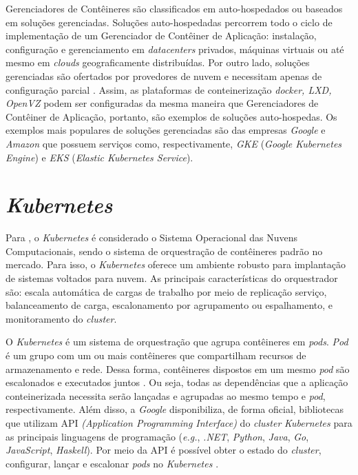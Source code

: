 Gerenciadores de Contêineres são classificados em auto-hospedados ou baseados em soluções gerenciadas. Soluções auto-hospedadas percorrem todo o ciclo de implementação de um Gerenciador de Contêiner de Aplicação: instalação, configuração e gerenciamento em \textit{datacenters} privados, máquinas virtuais ou até mesmo em \textit{clouds} geograficamente distribuídas. Por outro lado, soluções gerenciadas são ofertados por provedores de nuvem e necessitam apenas de configuração parcial \cite{casalicchio2020state}. Assim, as plataformas de conteinerização \textit{docker, LXD, OpenVZ} podem ser configuradas da mesma maneira que Gerenciadores de Contêiner de Aplicação, portanto, são exemplos de soluções auto-hospedas. Os exemplos mais populares de soluções gerenciadas são das empresas \textit{Google} e \textit{Amazon} que possuem serviços como, respectivamente, \textit{GKE} (\textit{Google Kubernetes Engine}) e \textit{EKS} (\textit{Elastic Kubernetes Service}).

\section{\textit{Kubernetes}}
Para , o \textit{Kubernetes} é considerado o Sistema Operacional das Nuvens Computacionais, sendo o sistema de orquestração de contêineres padrão no mercado. Para isso, o \textit{Kubernetes} oferece um ambiente robusto para implantação de sistemas voltados para nuvem. As principais características do orquestrador são: escala automática de cargas de trabalho por meio de replicação serviço, balanceamento de carga, escalonamento por agrupamento ou espalhamento, e monitoramento do \textit{cluster}.

O \textit{Kubernetes} é um sistema de orquestração que agrupa contêineres em \textit{pods}. \textit{Pod} é um grupo com um ou mais contêineres que compartilham recursos de armazenamento e rede. Dessa forma, contêineres dispostos em um mesmo \textit{pod} são escalonados e executados juntos \cite{Google}. Ou seja, todas as dependências que a aplicação conteinerizada necessita serão lançadas e agrupadas ao mesmo tempo e \textit{pod}, respectivamente. Além disso, a \textit{Google} disponibiliza, de forma oficial, bibliotecas que utilizam API \textit{(Application Programming Interface)} do \textit{cluster} \textit{Kubernetes}  para as principais linguagens de programação (\textit{e.g.}, \textit{.NET}, \textit{Python}, \textit{Java}, \textit{Go}, \textit{JavaScript}, \textit{Haskell}). Por meio da API é possível obter o estado do \textit{cluster}, configurar, lançar e escalonar \textit{pods} no \textit{Kubernetes} \cite{KubernetesAPI}.

